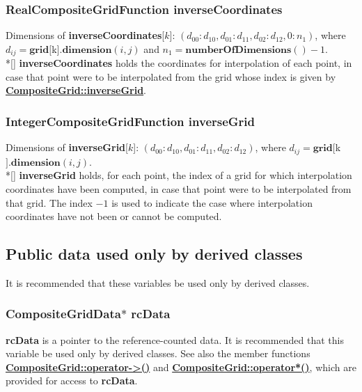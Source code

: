 \documentclass{article}
\begin{document}
  \subsubsection{RealCompositeGridFunction inverseCoordinates}
  \label{CompositeGrid::inverseCoordinates}
    Dimensions of \textbf{inverseCoordinates}[$k$]: $(d_{00}\colon d_{10},d_{01}\colon d_{11},d_{02}\colon d_{12},0\colon n_1)$,
    where $d_{ij} = \textbf{grid}[$k$].\textbf{dimension}(i,j)$ and $n_1 = \textbf{numberOfDimensions}() - 1$. \\*[\parskip]
    \textbf{inverseCoordinates} holds the coordinates for interpolation of each point, in case that point were to be interpolated from the
    grid whose index is given by {\bf{}\hyperref{inverseGrid}{inverseGrid \rm(\S}{)}{CompositeGrid::inverseGrid}}.

  \subsubsection{IntegerCompositeGridFunction inverseGrid}
  \label{CompositeGrid::inverseGrid}
    Dimensions of \textbf{inverseGrid}[$k$]: $(d_{00}\colon d_{10},d_{01}\colon d_{11},d_{02}\colon d_{12})$,
    where $d_{ij} = \textbf{grid}[$k$].\textbf{dimension}(i,j)$. \\*[\parskip]
    \textbf{inverseGrid} holds, for each point, the index of a grid for which interpolation coordinates have been computed,
    in case that point were to be interpolated from that grid.
    The index $-1$ is used to indicate the case where interpolation coordinates have not been or cannot be computed.

\subsection{Public data used only by derived classes}
\label{CompositeGrid::PublicDerivedClassData}

It is recommended that these variables be used only by derived classes.

  \subsubsection{CompositeGridData$*$ rcData}
  \label{CompositeGrid::rcData}
    \textbf{rcData} is a pointer to the reference-counted data.
    It is recommended that this variable be used only by derived classes.
    See also the member functions
    {\bf{}\hyperref{operator${-}{>}$()}{operator${-}{>}$() \rm(\S}{)}{CompositeGrid::operator->()}}
    and {\bf{}\hyperref{operator$*$()}{operator$*$() \rm(\S}{)}{CompositeGrid::operator*()}},
    which are provided for access to \textbf{rcData}.
\end{document}
